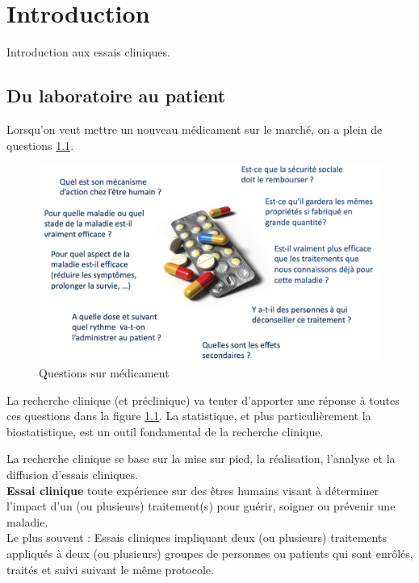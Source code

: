 \chapter{Introduction}

Introduction aux essais cliniques.

\section{Du laboratoire au patient}
Lorsqu'on veut mettre un nouveau médicament sur le marché, on a plein de questions \ref{fig:questions}.

\begin{figure}[H]
    \centering
    \includegraphics[scale=0.2]{images/questions.png}
    \caption{Questions sur médicament}
    \label{fig:questions}
\end{figure}

La recherche clinique (et préclinique) va tenter d’apporter une réponse à toutes ces questions dans la figure \ref{fig:questions}. La statistique, et plus particulièrement la biostatistique, est un outil fondamental de la recherche clinique.

La recherche clinique se base sur la mise sur pied, la réalisation, l’analyse et la diffusion d’essais cliniques.\\


\textbf{Essai clinique} toute expérience sur des êtres humains visant à déterminer l’impact d’un (ou plusieurs) traitement(s) pour guérir, soigner ou prévenir une maladie.\\

Le plus souvent : Essais cliniques impliquant deux (ou plusieurs) traitements appliqués à deux (ou plusieurs) groupes de personnes ou patients qui sont enrôlés, traités et suivi suivant le même protocole.\\

